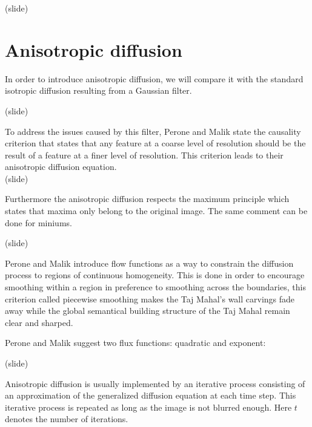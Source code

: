 \documentclass{article}
\begin{document}
(slide)

\section{Anisotropic diffusion}

In order to introduce anisotropic diffusion, we will compare it with the standard isotropic diffusion resulting from a Gaussian filter.

(slide)

To address the issues caused by this filter, Perone and Malik state the causality criterion that states that any feature at a coarse level of resolution should be the result of a feature at a finer level of resolution. This criterion leads to their anisotropic diffusion equation.\\

(slide)

Furthermore the anisotropic diffusion respects the maximum principle which states that maxima only belong to the original image. The same comment can be done for miniums.

(slide)

Perone and Malik introduce flow functions as a way to constrain the diffusion process to regions of continuous homogeneity. This is done in order to encourage smoothing within a region in preference to smoothing across the boundaries, this criterion called piecewise smoothing makes the Taj Mahal's wall carvings fade away while the global semantical building structure of the Taj Mahal remain clear and sharped.

Perone and Malik suggest two flux functions: quadratic and exponent:


(slide)

Anisotropic diffusion is usually implemented by an iterative process consisting of an approximation of the generalized diffusion equation at each time step. This iterative process is repeated as long as the image is not blurred enough.
Here $t$ denotes the number of iterations.
\end{document}
